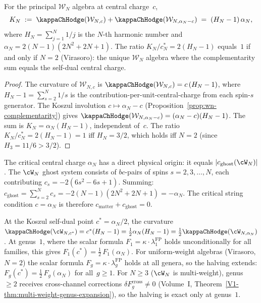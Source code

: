 \begin{proposition}
\label{prop:complementarity-sum-formula}
For the principal $\mathcal{W}_N$ algebra at central charge~$c$,
\begin{equation}\label{eq:complementarity-sum-formula}
K_N \;:=\; \kappaChHodge(\mathcal{W}_{N,c})
 + \kappaChHodge(\mathcal{W}_{N,\alpha_N - c})
\;=\; (H_N - 1)\,\alpha_N,
\end{equation}
where $H_N = \sum_{j=1}^N 1/j$ is the $N$-th harmonic number
and $\alpha_N = 2(N{-}1)(2N^2{+}2N{+}1)$. The ratio
$K_N/c_N^* = 2(H_N - 1)$ equals~$1$ if and only if $N = 2$
\textup{(}Virasoro\textup{)}: the unique $\mathcal{W}_N$ algebra
where the complementarity sum equals the self-dual central charge.
\end{proposition}

\begin{proof}
The curvature of $\mathcal{W}_{N,c}$ is
$\kappaChHodge(\mathcal{W}_{N,c}) = c\,(H_N - 1)$, where $H_N - 1
= \sum_{s=2}^N 1/s$ is the contribution-per-unit-central-charge
from each spin-$s$ generator. The Koszul involution
$c \mapsto \alpha_N - c$
(Proposition~\ref{prop:wn-complementarity}) gives
$\kappaChHodge(\mathcal{W}_{N,\alpha_N - c}) = (\alpha_N - c)(H_N - 1)$.
The sum is $K_N = \alpha_N(H_N - 1)$, independent of~$c$.
The ratio $K_N/c_N^* = 2(H_N - 1) = 1$ iff $H_N = 3/2$, which
holds iff $N = 2$ (since $H_3 = 11/6 > 3/2$).
\end{proof}

\begin{remark}%
\label{rem:ghost-identity-alphaN}%
%
The critical central charge $\alpha_N$ has a direct
physical origin: it equals $|c_{\mathrm{ghost}}(\cW_N)|$.
The $\cW_N$ ghost system consists of $bc$-pairs of
spins $s = 2, 3, \ldots, N$, each contributing
$c_s = -2(6s^2 - 6s + 1)$. Summing:
$c_{\mathrm{ghost}} = \sum_{s=2}^{N} c_s
= -2(N{-}1)(2N^2{+}2N{+}1) = -\alpha_N$.
The critical string condition $c = \alpha_N$ is
therefore $c_{\mathrm{matter}} + c_{\mathrm{ghost}} = 0$.
\end{remark}

\begin{remark}%
\label{rem:self-dual-halving}%
%
At the Koszul self-dual point $c^* = \alpha_N/2$,
the curvature $\kappaChHodge(\cW_{N,c^*}) = c^*(H_N - 1)
= \tfrac{1}{2}\alpha_N(H_N - 1)
= \tfrac{1}{2}\kappaChHodge(\cW_{N,\alpha_N})$.
At genus~$1$, where the scalar formula
$F_1 = \kappa \cdot \lambda_1^{\mathrm{FP}}$ holds
unconditionally for all families, this gives
$F_1(c^*) = \tfrac{1}{2}\,F_1(\alpha_N)$.
For uniform-weight algebras (Virasoro, $N = 2$) the
scalar formula $F_g = \kappa\cdot\lambda_g^{\mathrm{FP}}$
holds at all genera, so the halving extends:
$F_g(c^*) = \tfrac{1}{2}\,F_g(\alpha_N)$ for all~$g \ge 1$.
For $N \ge 3$ ($\cW_N$ is multi-weight), genus~$\ge 2$
receives cross-channel corrections
$\delta F_g^{\mathrm{cross}} \ne 0$
(Volume~I, Theorem~\textup{\ref{V1-thm:multi-weight-genus-expansion}}),
so the halving is exact only at genus~$1$.
\end{remark}

